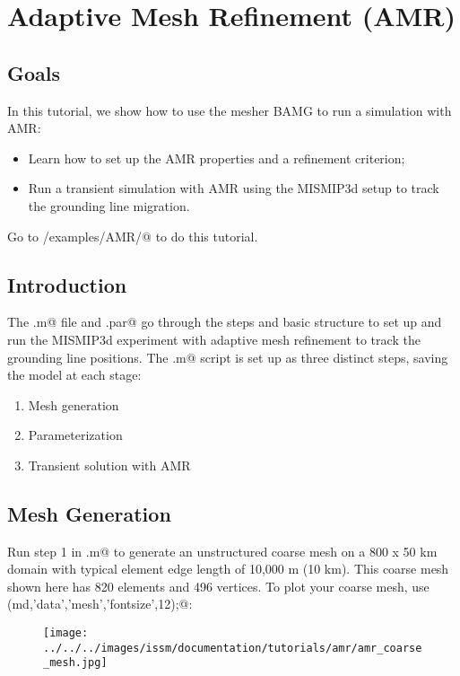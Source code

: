 \section{Adaptive Mesh Refinement (AMR)}
\subsection{Goals} %
In this tutorial, we show how to use the mesher BAMG to run a simulation with AMR:
\begin{itemize}
	\item Learn how to set up the AMR properties and a refinement criterion;
	\item Run a transient simulation with AMR using the MISMIP3d setup to track the grounding line migration.
\end{itemize} 

Go to \verb@trunk/examples/AMR/@ to do this tutorial.
\subsection{Introduction}
The \verb@runme.m@ file and \verb@mismip.par@ go through the steps and basic structure to set up and run the MISMIP3d experiment with adaptive mesh refinement to track the grounding line positions. The \verb@runme.m@ script is set up as three distinct steps, saving the model at each stage:
\begin{enumerate}
	\item Mesh generation
	\item Parameterization
	\item Transient solution with AMR
\end{enumerate}

\subsection{Mesh Generation}
Run step 1 in \verb@runme.m@ to generate an unstructured coarse mesh on a 800 x 50 km domain with typical element edge length of 10,000 m (10 km).  This coarse mesh shown here has 820 elements and 496 vertices. To plot your coarse mesh, use \verb@plotmodel(md,'data','mesh','fontsize',12);@:
\begin{figure}[H]
	\begin{center}
		\texttt{[image: ../../../images/issm/documentation/tutorials/amr/amr\_coarse\_mesh.jpg]}
	\end{center}
\end{figure}

